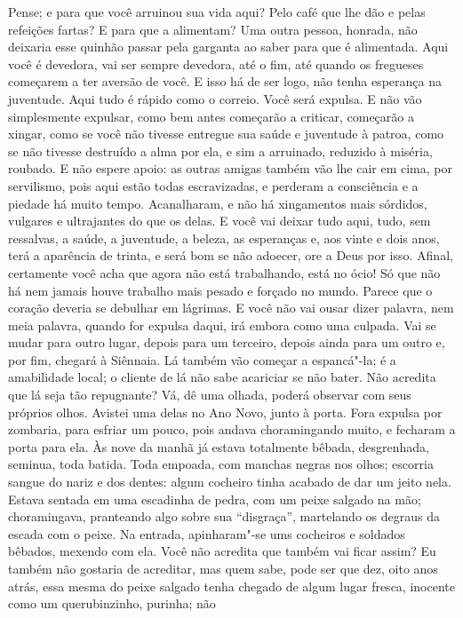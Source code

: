 Pense; e para que você arruinou sua vida aqui? Pelo café que lhe dão e
pelas refeições fartas? E para que a alimentam? Uma outra pessoa,
honrada, não deixaria esse quinhão passar pela garganta ao saber para
que é alimentada. Aqui você é devedora, vai ser sempre devedora, até o
fim, até quando os fregueses começarem a ter aversão de você. E isso há
de ser logo, não tenha esperança na juventude. Aqui tudo é rápido como o
correio. Você será expulsa. E não vão simplesmente expulsar, como bem
antes começarão a criticar, começarão a xingar, como se você não tivesse
entregue sua saúde e juventude à patroa, como se não tivesse destruído a
alma por ela, e sim a arruinado, reduzido à miséria, roubado. E não
espere apoio: as outras amigas também vão lhe cair em cima, por
servilismo, pois aqui estão todas escravizadas, e perderam a consciência
e a piedade há muito tempo. Acanalharam, e não há xingamentos mais
sórdidos, vulgares e ultrajantes do que os delas. E você vai deixar tudo
aqui, tudo, sem ressalvas, a saúde, a juventude, a beleza, as esperanças
e, aos vinte e dois anos, terá a aparência de trinta, e será bom se não
adoecer, ore a Deus por isso. Afinal, certamente você acha que agora não
está trabalhando, está no ócio! Só que não há nem jamais houve trabalho
mais pesado e forçado no mundo. Parece que o coração deveria se debulhar
em lágrimas. E você não vai ousar dizer palavra, nem meia palavra,
quando for expulsa daqui, irá embora como uma culpada. Vai se mudar para
outro lugar, depois para um terceiro, depois ainda para um outro e, por
fim, chegará à Siênnaia. Lá também vão começar a espancá"-la; é a
amabilidade local; o cliente de lá não sabe acariciar se não bater. Não
acredita que lá seja tão repugnante? Vá, dê uma olhada, poderá observar
com seus próprios olhos. Avistei uma delas no Ano Novo, junto à porta.
Fora expulsa por zombaria, para esfriar um pouco, pois andava
choramingando muito, e fecharam a porta para ela. Às nove da manhã já
estava totalmente bêbada, desgrenhada, seminua, toda batida. Toda
empoada, com manchas negras nos olhos; escorria sangue do nariz e dos
dentes: algum cocheiro tinha acabado de dar um jeito nela. Estava
sentada em uma escadinha de pedra, com um peixe salgado na mão;
choramingava, pranteando algo sobre sua ``disgraça'', martelando os
degraus da escada com o peixe. Na entrada, apinharam"-se ums cocheiros e
soldados bêbados, mexendo com ela. Você não acredita que também vai
ficar assim? Eu também não gostaria de acreditar, mas quem sabe, pode
ser que dez, oito anos atrás, essa mesma do peixe salgado tenha chegado
de algum lugar fresca, inocente como um querubinzinho, purinha; não
